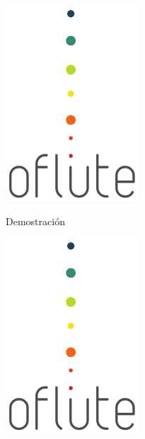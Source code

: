 {
  \begin{frame}
    \frametitle{}
    
    \begin{center}

      \includegraphics[scale=1]{imagenes/logotipo}
      
      \bigskip
      \bigskip

      {\Large Demostración}

    \end{center}

  \end{frame}

  \begin{frame}{}
    
    \begin{center}
      \includegraphics[scale=0.8]{imagenes/logotipo}


\end{center}
\end{frame}}
